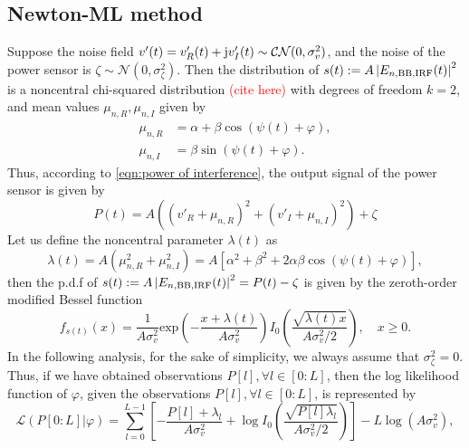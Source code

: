 \documentclass[12pt,draftclsnofoot,journal,onecolumn]{IEEEtran}
\theoremstyle{nonumberplain}
\def \exp {\text{exp}}
\def \ch {\textcolor{red}{(cite here) }}
\begin{document}
\subsection{Newton-ML method}  \label{ML method}
    Suppose the noise field $v'(t)=v'_R(t) + {\rm j}v'_I(t)\sim \mathcal{CN}(0, \sigma_v^2)$, and the noise of the power sensor is $\zeta \sim \mathcal{N}(0, \sigma_{\zeta}^2)$. Then the distribution of $s(t) := A\left|E_{n, {\rm BB}, {\rm IRF}}(t)\right|^2$ is a noncentral chi-squared distribution \ch with degrees of freedom $k=2$, and mean values $\mu_{n,R}, \mu_{n,I}$ given by
    \begin{subequations}
    \label{chi2 distribution mean values}
        \begin{align}
        \label{mu_n,R}
        \mu_{n,R} & = \alpha + \beta \cos(\psi(t)+\varphi),\\
        \label{mu_n,L}
        \mu_{n,I} & = \beta \sin(\psi(t)+\varphi).
        \end{align}
    \end{subequations}
    Thus, according to \eqref{eqn:power of interference}, the output signal of the power sensor is given by 
    \begin{equation}
        P(t)  = A\left((v'_{R} + \mu_{n,R})^2 + (v'_{I} + \mu_{n,I})^2 \right)+ \zeta 
        \label{eqn:sensor power}
    \end{equation}
    Let us define the noncentral parameter $\lambda(t)$ as
    \begin{equation}
        \lambda(t)  = A(\mu_{n,R}^2 + \mu_{n,I}^2) = A\left[\alpha^{2}+\beta^{2}+2\alpha\beta\cos\left(\psi(t)+\varphi\right)\right],
    \end{equation}
    then the p.d.f of $s(t)  := A\left|E_{n, {\rm BB}, {\rm IRF}}(t)\right|^2 = P(t)-\zeta$ is given by the zeroth-order modified Bessel function
    \begin{equation}
        f_{s(t)}(x) = \frac{1}{A\sigma_{v}^2} \exp\left(-\frac{x+\lambda(t)}{A\sigma_v^2}\right)I_{0}\left(\frac{\sqrt{\lambda(t) x}}{A\sigma_v^2/2}\right),\quad x \geq 0.
        \label{ML single observation}
    \end{equation}
    In the following analysis, for the sake of simplicity, we always assume that $\sigma_{\zeta}^2 = 0$. Thus, if we have obtained observations $P[l], \forall l\in [0:L]$, then the log likelihood function of $\varphi$, given the observations $P[l], \forall l\in [0:L]$, is represented by
    \begin{equation}
        \mathcal{L}(P[0:L] | \varphi) = \sum_{l=0}^{L-1}\left[-\frac{P[l] + \lambda_l}{A\sigma_v^2} + \log I_0\left(\frac{\sqrt{P[l] \lambda_l}}{A\sigma_v^2/2}\right)\right] - L\log(A\sigma_v^2),
        \label{ML likelihood}
    \end{equation}
\end{document}
